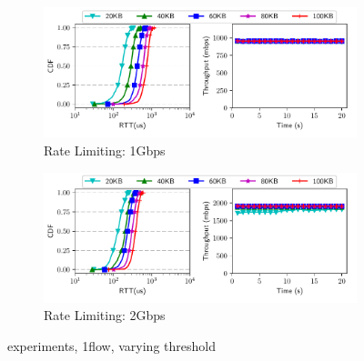 
\begin{figure}[!tb]
\centering

\begin{subfigure}[b]{0.45\textwidth}
\centering
\includegraphics[width=\textwidth]{rate_limiter/raw_data/dem_benchmark/1gbps.pdf}
\caption{Rate Limiting: 1Gbps}
\label{fig:dem-1g} 
\end{subfigure}
\begin{subfigure}[b]{0.45\textwidth}
\centering
\includegraphics[width=\textwidth]{rate_limiter/raw_data/dem_benchmark/2gbps.pdf}
\caption{Rate Limiting: 2Gbps}
\label{fig:dem-2g} 
\end{subfigure}
\caption{\dem{} experiments, 1flow, varying threshold}
\label{fig:dem} 
\end{figure}

